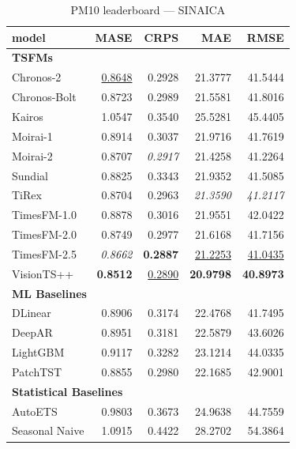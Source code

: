 \begin{table}[H]
\caption{PM10 leaderboard --- SINAICA}
\centering
\begin{small}
\begin{tabular}{lrrrr}
\toprule
model & MASE & CRPS & MAE & RMSE \\
\midrule
\multicolumn{5}{l}{\textbf{TSFMs}} \\
Chronos-2 & \underline{0.8648} & 0.2928 & 21.3777 & 41.5444 \\
Chronos-Bolt & 0.8723 & 0.2989 & 21.5581 & 41.8016 \\
Kairos & 1.0547 & 0.3540 & 25.5281 & 45.4405 \\
Moirai-1 & 0.8914 & 0.3037 & 21.9716 & 41.7619 \\
Moirai-2 & 0.8707 & \textit{0.2917} & 21.4258 & 41.2264 \\
Sundial & 0.8825 & 0.3343 & 21.9352 & 41.5085 \\
TiRex & 0.8704 & 0.2963 & \textit{21.3590} & \textit{41.2117} \\
TimesFM-1.0 & 0.8878 & 0.3016 & 21.9551 & 42.0422 \\
TimesFM-2.0 & 0.8749 & 0.2977 & 21.6168 & 41.7156 \\
TimesFM-2.5 & \textit{0.8662} & \textbf{0.2887} & \underline{21.2253} & \underline{41.0435} \\
VisionTS++ & \textbf{0.8512} & \underline{0.2890} & \textbf{20.9798} & \textbf{40.8973} \\
\midrule
\multicolumn{5}{l}{\textbf{ML Baselines}} \\
DLinear & 0.8906 & 0.3174 & 22.4768 & 41.7495 \\
DeepAR & 0.8951 & 0.3181 & 22.5879 & 43.6026 \\
LightGBM & 0.9117 & 0.3282 & 23.1214 & 44.0335 \\
PatchTST & 0.8855 & 0.2980 & 22.1685 & 42.9001 \\
\midrule
\multicolumn{5}{l}{\textbf{Statistical Baselines}} \\
AutoETS & 0.9803 & 0.3673 & 24.9638 & 44.7559 \\
Seasonal Naive & 1.0915 & 0.4422 & 28.2702 & 54.3864 \\
\bottomrule
\end{tabular}
\end{small}
\end{table}